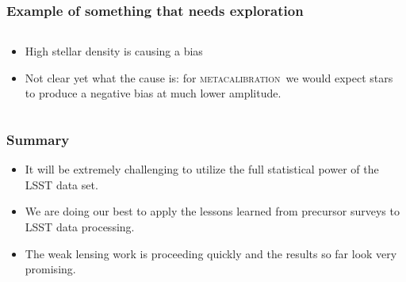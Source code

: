 \documentclass{beamer}
\newcommand{\mcal}{\textsc{metacalibration}}
\begin{document}
\frame
{


    \frametitle{Example of something that needs exploration}


    \begin{columns}
        \begin{column}{0.5\textwidth}
        \begin{itemize}

            \item High stellar density is causing a bias

            \item Not clear yet what the cause is: for \mcal\ we would
                expect stars to produce a negative bias at much
                lower amplitude.

        \end{itemize}
        \end{column}
        \begin{column}{0.5\textwidth}
            \begin{center}
                \texttt{[image: \{m-vs-density.png]}}
            \end{center}
            
        \end{column}
    \end{columns}


}

\frame
{


    \frametitle{Summary}

    \begin{itemize} 

        \item It will be extremely challenging to utilize the full statistical power
            of the LSST data set.

        \item We are doing our best to apply the lessons learned from precursor surveys to
            LSST data processing.

        \item The weak lensing work is proceeding quickly and the results so far look
            very promising.

    \end{itemize} 

}
\end{document}
